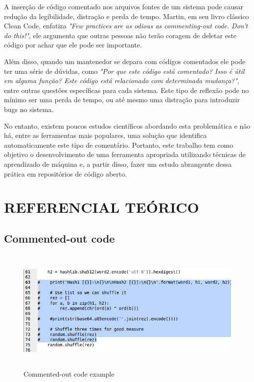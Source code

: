 \documentclass{abnt}
\begin{document}
A inserção de código comentado nos arquivos fontes de um sistema pode causar
redução da legibilidade, distração e perda de tempo. Martin, em seu livro clássico
Clean Code, enfatiza \textit{"Few practices are as odious as commenting-out code. 
Don’t do this!"}, ele argumenta que outras pessoas não terão coragem de deletar 
este código por achar que ele pode ser importante. 

Além disso, quando um mantenedor se depara com códigos comentados ele pode ter uma 
série de dúvidas, como \textit{"Por que este código está comentado? Isso é útil em 
alguma função? Este código está relacionado com determinada mudança?"}, entre outras 
questões específicas para cada sistema. Este tipo de reflexão pode no mínimo ser 
uma perda de tempo, ou até mesmo uma distração para introduzir bugs no sistema.

No entanto, existem poucos estudos científicos abordando esta problemática e não 
há, entre as ferramentas mais populares, uma solução que identifica automaticamente
este tipo de comentário. Portanto, este trabalho tem como objetivo o desenvolvimento
de uma ferramenta apropriada utilizando técnicas de aprendizado de máquina e, a partir
disso, fazer um estudo abrangente dessa prática em repositórios de código aberto.


\chapter{REFERENCIAL TEÓRICO}


\section{Commented-out code}

\begin{figure}[h!]
  \centering
  \includegraphics[height=2.4in,width=6.3in]{images/gcc06.png}
  \caption{Commented-out code example}
  \label{fig:commentExample}
\end{figure}
\end{document}
